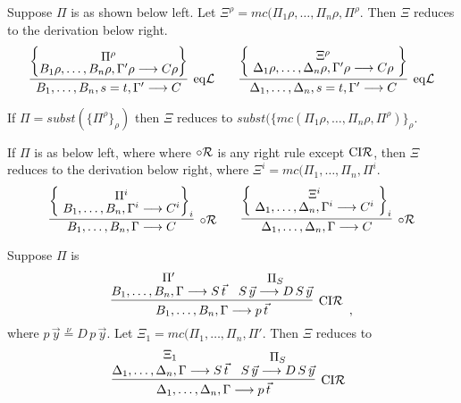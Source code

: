 \documentclass[preprint]{elsarticle}
\newcommand{\Seq}[2]{#1\longrightarrow #2}
\newcommand{\circR}{\circ{\cal R}}
\newcommand{\defnu}{\stackrel{\nu}{=}}
\newcommand{\eqL}{{\rm eq}{\cal L}}
\newcommand{\coindR}{{\rm CI}{\cal R}}
\begin{document}
\begin{trivlist}
\item[\fbox{$-/\eqL$}] Suppose $\Pi$ is as shown below left.
Let $\Xi^\rho = mc(\Pi_1\rho,\ldots,\Pi_n\rho,\Pi^\rho$.
Then $\Xi$ reduces to the derivation below right.
  \begin{displaymath}
    \infer[\eqL]{\Seq{B_1,\ldots,B_n,s=t,\Gamma'}{C}}
    {\left\{\raisebox{-1.5ex}
        {\deduce{\Seq{B_1\rho,\ldots, B_n\rho,\Gamma'\rho}{C\rho}}
          {\Pi^{\rho}}}\right\}}
    \qquad
    \infer[\eqL]
    {\Seq{\Delta_1,\ldots,\Delta_n,s=t,\Gamma'}{C}}
    {
      \left\{
      \raisebox{-1.3ex}
      {
        \deduce{\Seq{\Delta_1\rho,\ldots,\Delta_n\rho,\Gamma'\rho}{C\rho}}{\Xi^\rho}
      }
      \right\}
    }
  \end{displaymath}


\item[\fbox{$-/ subst$}] If $\Pi = subst(\{\Pi^\rho\}_\rho)$ 
then $\Xi$ reduces to $subst(\{mc(\Pi_1\rho,\ldots,\Pi_n\rho,\Pi^\rho)\}_\rho$.



\item[\fbox{$-/\circR$}] If $\Pi$ is as below left, where 
  where $\circR$ is any right rule except $\coindR$, then $\Xi$ reduces
  to the derivation below right, where $\Xi^i = mc(\Pi_1,\ldots,\Pi_n,\Pi^i$. 
  \begin{displaymath}
    \infer[\circR]{\Seq{B_1,\ldots,B_n,\Gamma}{C}}
    {\left\{\raisebox{-1.5ex}{
          \deduce{\Seq{B_1,\ldots,B_n,\Gamma^i}{C^i}}
          {\Pi^i}}\right\}_i}
    \qquad
    \infer[\circR]
          {\Seq{\Delta_1,\ldots,\Delta_n,\Gamma}{C}}
          {
            \left\{
            \raisebox{-1.3ex}{
              \deduce{\Seq{\Delta_1,\ldots,\Delta_n,\Gamma^i}{C^i}}{\Xi^i}
              }
            \right\}_i
          }
  \end{displaymath}



\item[\fbox{$-/\coindR$}] Suppose $\Pi$ is 
$$
\infer[\coindR] {\Seq{B_1,\dots,B_n,\Gamma}{p\,\vec{t}}} {
  \deduce{\Seq{B_1,\dots,B_n,\Gamma} {S\,\vec{t}}}{\Pi'} &
  \deduce{\Seq{S\,\vec{y}}{D\,S\,\vec{y}}}{\Pi_S} } \enspace ,
$$
where $p\,\vec{y} \defnu D\,p\,\vec{y}$.  
Let $\Xi_1 = mc(\Pi_1,\ldots,\Pi_n,\Pi'$. 
Then $\Xi$ reduces to
$$
\infer[\coindR] {\Seq{\Delta_1,\dots,\Delta_n,\Gamma}{p\,\vec{t}}} {
  \deduce{\Seq{\Delta_1,\dots,\Delta_n,\Gamma} {S\,\vec{t}}}{\Xi_1} &
  \deduce{\Seq{S\,\vec{y}}{D\,S\,\vec{y}}}{\Pi_S} } \enspace
$$
\end{trivlist}
\end{document}
